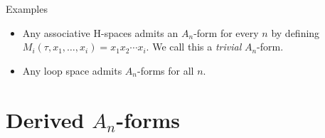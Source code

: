 \documentclass{beamer}
\theoremstyle{definition}
\newtheorem{defi}{Definition}
\DeclareMathOperator{\im}{im}
\begin{document}
\begin{frame}
\begin{block}{Examples}
\begin{itemize}
\item<1->Any associative H-spaces admits an $A_n$-form for every $n$ by defining $M_i(\tau,x_1,\dots,x_i)=x_1x_2\cdots x_i$. We call this a \emph{trivial} $A_n$-form.
\item<2-> Any loop space admits $A_n$-forms for all $n$.
\end{itemize}
\end{block}

\end{frame}


\section{Derived $A_n$-forms}
\begin{frame}

\end{frame}
%
%
\end{document}
